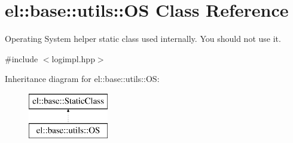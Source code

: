 \hypertarget{classel_1_1base_1_1utils_1_1OS}{\section{el\-:\-:base\-:\-:utils\-:\-:O\-S Class Reference}
\label{classel_1_1base_1_1utils_1_1OS}
}


Operating System helper static class used internally. You should not use it.  




{\ttfamily \#include $<$logimpl.\-hpp$>$}

Inheritance diagram for el\-:\-:base\-:\-:utils\-:\-:O\-S\-:\begin{figure}[H]
\begin{center}
\leavevmode
\includegraphics[height=2.000000cm]{classel_1_1base_1_1utils_1_1OS}
\end{center}
\end{figure}
